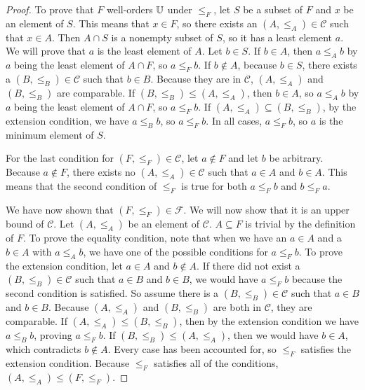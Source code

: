 \documentclass[../math.tex]{subfiles}
\begin{document}
\begin{proof}
    To prove that $F$ well-orders $\mathbb{U}$ under $\leq_F$, let $S$ be a subset of
    $F$ and $x$ be an element of $S$.  This means that $x \in F$, so there
    exists an $(A, \leq_A) \in \mathcal C$ such that $x \in A$.  Then $A \cap S$
    is a nonempty subset of $S$, so it has a least element $a$.  We will prove
    that $a$ is the least element of $A$.  Let $b \in S$.  If $b \in A$, then $a
    \leq_A b$ by $a$ being the least element of $A \cap F$, so $a \leq_F b$.  If
    $b \notin A$, because $b \in S$, there exists a $(B, \leq_B) \in \mathcal C$
    such that $b \in B$.  Because they are in $\mathcal C$, $(A, \leq_A)$ and
    $(B, \leq_B)$ are comparable.  If $(B, \leq_B) \leq (A, \leq_A)$, then $b
    \in A$, so $a \leq_A b$ by $a$ being the least element of $A \cap F$, so $a
    \leq_F b$.  If $(A, \leq_A) \subseteq (B, \leq_B)$, by the extension
    condition, we have $a \leq_B b$, so $a \leq_F b$.  In all cases, $a \leq_F
    b$, so $a$ is the minimum element of $S$.

    For the last condition for $(F, \leq_F) \in \mathcal C$, let $a \notin F$
    and let $b$ be arbitrary.  Because $a \notin F$, there exists no $(A,
    \leq_A) \in \mathcal C$ such that $a \in A$ and $b \in A$.  This means that
    the second condition of $\leq_F$ is true for both $a \leq_F b$ and $b \leq_F
    a$.

    We have now shown that $(F, \leq_F) \in \mathcal F$.  We will now show that
    it is an upper bound of $\mathcal C$.  Let $(A, \leq_A)$ be an element of
    $\mathcal C$.  $A \subseteq F$ is trivial by the definition of $F$.  To
    prove the equality condition, note that when we have an $a \in A$ and a $b
    \in A$ with $a \leq_A b$, we have one of the possible conditions for $a
    \leq_F b$.  To prove the extension condition, let $a \in A$ and $b \notin
    A$.  If there did not exist a $(B, \leq_B) \in \mathcal C$ such that $a \in
    B$ and $b \in B$, we would have $a \leq_F b$ because the second condition is
    satisfied.  So assume there is a $(B, \leq_B) \in \mathcal C$ such that $a
    \in B$ and $b \in B$.  Because $(A, \leq_A)$ and $(B, \leq_B)$ are both in
    $\mathcal C$, they are comparable.  If $(A, \leq_A) \leq (B, \leq_B)$, then
    by the extension condition we have $a \leq_B b$, proving $a \leq_F b$.  If
    $(B, \leq_B) \leq (A, \leq_A)$, then we would have $b \in A$, which
    contradicts $b \notin A$.  Every case has been accounted for, so $\leq_F$
    satisfies the extension condition.  Because $\leq_F$ satisfies all of the
    conditions, $(A, \leq_A) \leq (F, \leq_F)$.


\end{proof}
\end{document}
